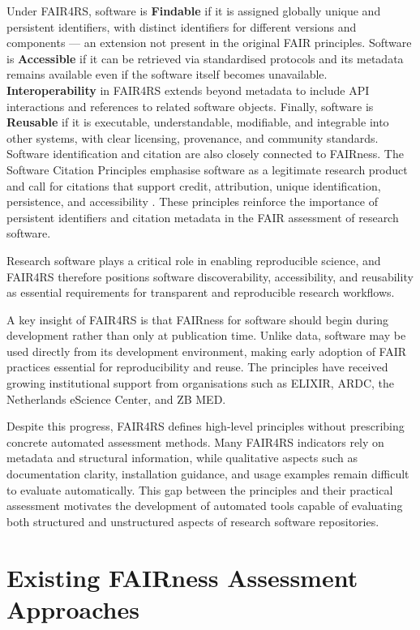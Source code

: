Under FAIR4RS, software is \textbf{Findable} if it is assigned 
globally unique and persistent identifiers, with distinct identifiers 
for different versions and components — an extension not present in 
the original FAIR principles. Software is \textbf{Accessible} if it 
can be retrieved via standardised protocols and its metadata remains 
available even if the software itself becomes unavailable. 
\textbf{Interoperability} in FAIR4RS extends beyond metadata to 
include API interactions and references to related software objects. 
Finally, software is \textbf{Reusable} if it is executable, 
understandable, modifiable, and integrable into other systems, with 
clear licensing, provenance, and community standards.
Software identification and citation are also closely connected to
FAIRness. The Software Citation Principles emphasise software as a
legitimate research product and call for citations that support
credit, attribution, unique identification, persistence, and
accessibility \cite{smith2016softwarecitation}. These principles
reinforce the importance of persistent identifiers and citation
metadata in the FAIR assessment of research software.

Research software plays a critical role in enabling reproducible 
science, and FAIR4RS therefore positions software discoverability, 
accessibility, and reusability as essential requirements for 
transparent and reproducible research workflows.

A key insight of FAIR4RS is that FAIRness for software should begin 
during development rather than only at publication time. Unlike data, 
software may be used directly from its development environment, making 
early adoption of FAIR practices essential for reproducibility and 
reuse. The principles have received growing institutional support from 
organisations such as ELIXIR, ARDC, the Netherlands eScience Center, 
and ZB MED.

Despite this progress, FAIR4RS defines high-level principles without 
prescribing concrete automated assessment methods. Many FAIR4RS 
indicators rely on metadata and structural information, while 
qualitative aspects such as documentation clarity, installation 
guidance, and usage examples remain difficult to evaluate 
automatically. This gap between the principles and their practical 
assessment motivates the development of automated tools capable of 
evaluating both structured and unstructured aspects of research 
software repositories.

\section{Existing FAIRness Assessment Approaches}

